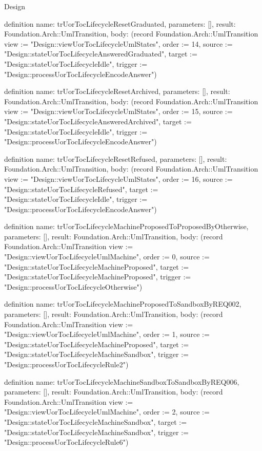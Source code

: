 \begin{lexlean}{Design}
\begin{semanticmodule}
definition{
  name: trUorTocLifecycleResetGraduated,
  parameters: [],
  result: Foundation.Arch::UmlTransition,
  body: (record Foundation.Arch::UmlTransition {view := "Design::viewUorTocLifecycleUmlStates", order := 14, source := "Design::stateUorTocLifecycleAnsweredGraduated", target := "Design::stateUorTocLifecycleIdle", trigger := "Design::processUorTocLifecycleEncodeAnswer"})
}

definition{
  name: trUorTocLifecycleResetArchived,
  parameters: [],
  result: Foundation.Arch::UmlTransition,
  body: (record Foundation.Arch::UmlTransition {view := "Design::viewUorTocLifecycleUmlStates", order := 15, source := "Design::stateUorTocLifecycleAnsweredArchived", target := "Design::stateUorTocLifecycleIdle", trigger := "Design::processUorTocLifecycleEncodeAnswer"})
}

definition{
  name: trUorTocLifecycleResetRefused,
  parameters: [],
  result: Foundation.Arch::UmlTransition,
  body: (record Foundation.Arch::UmlTransition {view := "Design::viewUorTocLifecycleUmlStates", order := 16, source := "Design::stateUorTocLifecycleRefused", target := "Design::stateUorTocLifecycleIdle", trigger := "Design::processUorTocLifecycleEncodeAnswer"})
}

definition{
  name: trUorTocLifecycleMachineProposedToProposedByOtherwise,
  parameters: [],
  result: Foundation.Arch::UmlTransition,
  body: (record Foundation.Arch::UmlTransition {view := "Design::viewUorTocLifecycleUmlMachine", order := 0, source := "Design::stateUorTocLifecycleMachineProposed", target := "Design::stateUorTocLifecycleMachineProposed", trigger := "Design::processUorTocLifecycleOtherwise"})
}

definition{
  name: trUorTocLifecycleMachineProposedToSandboxByREQ002,
  parameters: [],
  result: Foundation.Arch::UmlTransition,
  body: (record Foundation.Arch::UmlTransition {view := "Design::viewUorTocLifecycleUmlMachine", order := 1, source := "Design::stateUorTocLifecycleMachineProposed", target := "Design::stateUorTocLifecycleMachineSandbox", trigger := "Design::processUorTocLifecycleRule2"})
}

definition{
  name: trUorTocLifecycleMachineSandboxToSandboxByREQ006,
  parameters: [],
  result: Foundation.Arch::UmlTransition,
  body: (record Foundation.Arch::UmlTransition {view := "Design::viewUorTocLifecycleUmlMachine", order := 2, source := "Design::stateUorTocLifecycleMachineSandbox", target := "Design::stateUorTocLifecycleMachineSandbox", trigger := "Design::processUorTocLifecycleRule6"})
}


\end{semanticmodule}
\end{lexlean}
